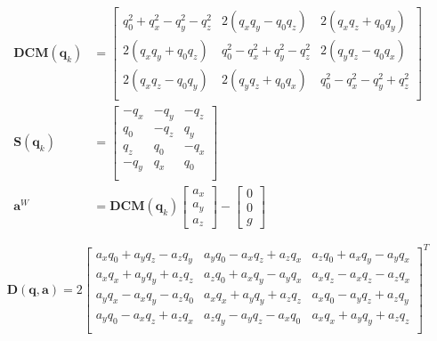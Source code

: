 \begin{align}
	\bm{DCM} \left( \bm{q}_k \right) &=  \begin{bmatrix}
		q_0^2 + q_x^2 - q_y^2 - q_z^2 & 2(q_x q_y - q_0 q_z) & 2(q_x q_z + q_0 q_y) \\
		2(q_x q_y + q_0 q_z) & q_0^2 - q_x^2 + q_y^2 - q_z^2 & 2(q_y q_z - q_0 q_x) \\
		2(q_x q_z - q_0 q_y) & 2(q_y q_z + q_0 q_x) & q_0^2 - q_x^2 - q_y^2 + q_z^2 \\
	\end{bmatrix}
	\\
	\bm{S} \left( \bm{q}_k \right)  &= \begin{bmatrix}
		-q_x & -q_y & -q_z \\
		q_0 & -q_z & q_y \\
		q_z & q_0 & -q_x \\
		-q_y & q_x & q_0 \\
	\end{bmatrix}
	\\
	\bm{a}^W &= \bm{DCM} \left( \bm{q}_k \right) \begin{bmatrix}
		a_x \\ a_y \\ a_z 
	\end{bmatrix} - \begin{bmatrix}
		0 \\ 0 \\ g 
	\end{bmatrix}
	\label{state_end}
\end{align}



\begin{equation}
	\bm{D} \left( \bm{q}, \bm{a}\right)
	=
	2
	\begin{bmatrix}
		a_xq_0 + a_yq_z - a_zq_y & a_yq_0 - a_xq_z + a_zq_x & a_zq_0 + a_xq_y - a_yq_x \\
		a_xq_x + a_yq_y + a_zq_z & a_zq_0 + a_xq_y - a_yq_x & a_xq_z - a_xq_z - a_zq_x \\
		a_yq_x - a_xq_y - a_zq_0 & a_xq_x + a_yq_y + a_zq_z & a_xq_0 - a_yq_z + a_zq_y \\
		a_yq_0 - a_xq_z + a_zq_x & a_zq_y - a_yq_z - a_xq_0 & a_xq_x + a_yq_y + a_zq_z \\
	\end{bmatrix}^T
	\label{state_jacobi_begin}
\end{equation}

